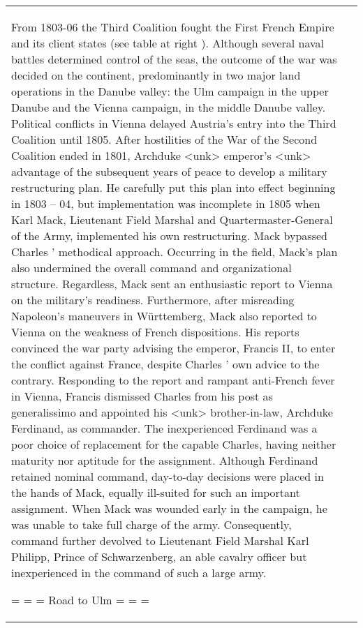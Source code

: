 \documentclass[11pt,a4paper]{article}
\begin{document}
\begin{center}
\begin{longtable}{p{7.8cm}|p{7.8cm}}
From 1803-06 the Third Coalition fought the First French Empire and its client states (see table at right ). Although several naval battles determined control of the seas, the outcome of the war was decided on the continent, predominantly in two major land operations in the Danube valley: the Ulm campaign in the upper Danube and the Vienna campaign, in the middle Danube valley. 
Political conflicts in Vienna delayed Austria's entry into the Third Coalition until 1805. After hostilities of the War of the Second Coalition ended in 1801, Archduke <unk> emperor's <unk> advantage of the subsequent years of peace to develop a military restructuring plan. He carefully put this plan into effect beginning in 1803 – 04, but implementation was incomplete in 1805 when Karl Mack, Lieutenant Field Marshal and Quartermaster-General of the Army, implemented his own restructuring. Mack bypassed Charles ' methodical approach. Occurring in the field, Mack's plan also undermined the overall command and organizational structure. Regardless, Mack sent an enthusiastic report to Vienna on the military's readiness. Furthermore, after misreading Napoleon's maneuvers in W\"{u}rttemberg, Mack also reported to Vienna on the weakness of French dispositions. His reports convinced the war party advising the emperor, Francis II, to enter the conflict against France, despite Charles ' own advice to the contrary. Responding to the report and rampant anti-French fever in Vienna, Francis dismissed Charles from his post as generalissimo and appointed his <unk> brother-in-law, Archduke Ferdinand, as commander. 
The inexperienced Ferdinand was a poor choice of replacement for the capable Charles, having neither maturity nor aptitude for the assignment. Although Ferdinand retained nominal command, day-to-day decisions were placed in the hands of Mack, equally ill-suited for such an important assignment. When Mack was wounded early in the campaign, he was unable to take full charge of the army. Consequently, command further devolved to Lieutenant Field Marshal Karl Philipp, Prince of Schwarzenberg, an able cavalry officer but inexperienced in the command of such a large army. 

= = = Road to Ulm = = = 


\end{longtable}
\end{center}
\end{document}

